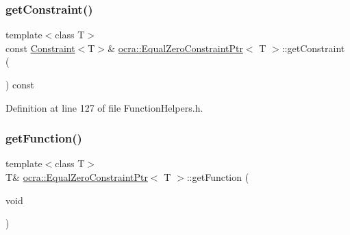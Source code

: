 \hypertarget{classocra_1_1EqualZeroConstraintPtr_a0fe913c6749ffdb91e86df3a5b4822a5}{}\label{classocra_1_1EqualZeroConstraintPtr_a0fe913c6749ffdb91e86df3a5b4822a5} 
\subsubsection{\texorpdfstring{get\+Constraint()}{getConstraint()}\hspace{0.1cm}{\footnotesize\ttfamily [2/2]}}
{\footnotesize\ttfamily template$<$class T$>$ \\
const \hyperlink{classocra_1_1Constraint}{Constraint}$<$T$>$\& \hyperlink{classocra_1_1EqualZeroConstraintPtr}{ocra\+::\+Equal\+Zero\+Constraint\+Ptr}$<$ T $>$\+::get\+Constraint (\begin{DoxyParamCaption}{ }\end{DoxyParamCaption}) const\hspace{0.3cm}{\ttfamily [inline]}}



Definition at line 127 of file Function\+Helpers.\+h.

\hypertarget{classocra_1_1EqualZeroConstraintPtr_a995f545eace80eb54d79dfcb48d724bd}{}\label{classocra_1_1EqualZeroConstraintPtr_a995f545eace80eb54d79dfcb48d724bd} 
\subsubsection{\texorpdfstring{get\+Function()}{getFunction()}\hspace{0.1cm}{\footnotesize\ttfamily [1/2]}}
{\footnotesize\ttfamily template$<$class T$>$ \\
T\& \hyperlink{classocra_1_1EqualZeroConstraintPtr}{ocra\+::\+Equal\+Zero\+Constraint\+Ptr}$<$ T $>$\+::get\+Function (\begin{DoxyParamCaption}\item[{void}]{ }\end{DoxyParamCaption})\hspace{0.3cm}{\ttfamily [inline]}}



